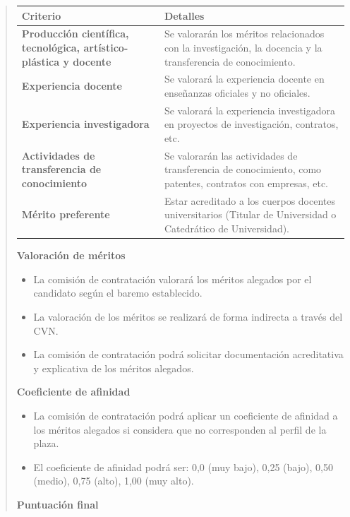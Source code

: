 \documentclass[12pt,a4paper,oneside]{report}
\begin{document}
\begin{itemize}
\begin{itemize}
\begin{quote}
\begin{tabular}{p{3.5cm} p{8cm}}
\toprule
\textbf{Criterio} & \textbf{Detalles} \\
\midrule
\textbf{Producción científica, tecnológica, artístico-plástica y docente} & Se valorarán los méritos relacionados con la investigación, la docencia y la transferencia de conocimiento. \\
\textbf{Experiencia docente} & Se valorará la experiencia docente en enseñanzas oficiales y no oficiales. \\
\textbf{Experiencia investigadora} & Se valorará la experiencia investigadora en proyectos de investigación, contratos, etc. \\
\textbf{Actividades de transferencia de conocimiento} & Se valorarán las actividades de transferencia de conocimiento, como patentes, contratos con empresas, etc. \\
\textbf{Mérito preferente} & Estar acreditado a los cuerpos docentes universitarios (Titular de Universidad o Catedrático de Universidad). \\
\bottomrule
\end{tabular}



\noindent\textbf{Valoración de méritos}\\

\begin{itemize}
  \item La comisión de contratación valorará los méritos alegados por el candidato según el baremo establecido.
  \item La valoración de los méritos se realizará de forma indirecta a través del CVN.
  \item La comisión de contratación podrá solicitar documentación acreditativa y explicativa de los méritos alegados.
\end{itemize}


\noindent\textbf{Coeficiente de afinidad}\\

\begin{itemize}
  \item La comisión de contratación podrá aplicar un coeficiente de afinidad a los méritos alegados si considera que no corresponden al perfil de la plaza.
  \item El coeficiente de afinidad podrá ser: 0,0 (muy bajo), 0,25 (bajo), 0,50 (medio), 0,75 (alto), 1,00 (muy alto).
\end{itemize}


\noindent\textbf{Puntuación final}\\


\end{quote}
\end{itemize}
\end{itemize}
\end{document}
